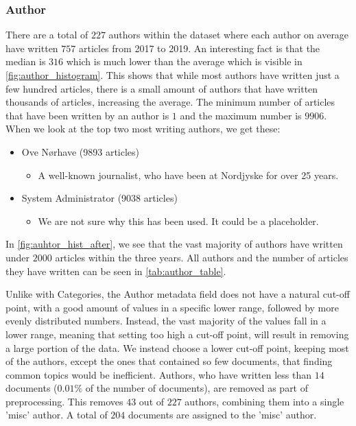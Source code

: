 \subsubsection{Author}\label{subsec:appendix_author}
There are a total of $227$ authors within the dataset where each author on average have written $757$ articles from 2017 to 2019.
An interesting fact is that the median is $316$ which is much lower than the average which is visible in \autoref{fig:author_histogram}.
This shows that while most authors have written just a few hundred articles, there is a small amount of authors that have written thousands of articles, increasing the average.
The minimum number of articles that have been written by an author is $1$ and the maximum number is $9906$.
When we look at the top two most writing authors, we get these:
\begin{itemize}
	\item Ove Nørhave (9893 articles)
	\begin{itemize}
		\item A well-known journalist, who have been at Nordjyske for over 25 years.
	\end{itemize}
	\item System Administrator (9038 articles)
	\begin{itemize}
		\item We are not sure why this has been used. It could be a placeholder.
	\end{itemize}
\end{itemize}

In \autoref{fig:auhtor_hist_after}, we see that the vast majority of authors have written under $2000$ articles within the three years. 
All authors and the number of articles they have written can be seen in \autoref{tab:author_table}.

Unlike with Categories, the Author metadata field does not have a natural cut-off point, with a good amount of values in a specific lower range, followed by more evenly distributed numbers.
Instead, the vast majority of the values fall in a lower range, meaning that setting too high a cut-off point, will result in removing a large portion of the data.
We instead choose a lower cut-off point, keeping most of the authors, except the ones that contained so few documents, that finding common topics would be inefficient.
Authors, who have written less than $14$ documents ($0.01\%$ of the number of documents), are removed as part of preprocessing.
This removes $43$ out of $227$ authors, combining them into a single 'misc' author.
A total of $204$ documents are assigned to the 'misc' author.


